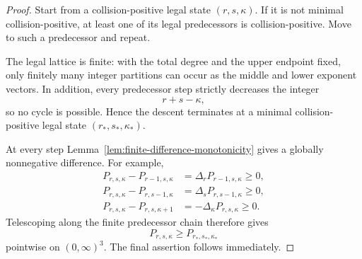 \documentclass[10pt,a4paper]{amsart}
\begin{document}
\begin{proof}
Start from a collision-positive legal state \((r,s,\kappa)\).  If it is not minimal collision-positive, at least one of its legal predecessors is collision-positive.  Move to such a predecessor and repeat.

The legal lattice is finite: with the total degree and the upper endpoint fixed, only finitely many integer partitions can occur as the middle and lower exponent vectors.  In addition, every predecessor step strictly decreases the integer
\begin{equation*}
r+s-\kappa,
\end{equation*}
so no cycle is possible.  Hence the descent terminates at a minimal collision-positive legal state \((r_*,s_*,\kappa_*)\).

At every step Lemma~\ref{lem:finite-difference-monotonicity} gives a globally nonnegative difference.  For example,
\begin{align*}
P_{r,s,\kappa}-P_{r-1,s,\kappa}
&=
\Delta_rP_{r-1,s,\kappa}
\ge0,\\
P_{r,s,\kappa}-P_{r,s-1,\kappa}
&=
\Delta_sP_{r,s-1,\kappa}
\ge0,\\
P_{r,s,\kappa}-P_{r,s,\kappa+1}
&=
-\Delta_\kappa P_{r,s,\kappa}
\ge0.
\end{align*}
Telescoping along the finite predecessor chain therefore gives
\begin{equation*}
P_{r,s,\kappa}
\ge
P_{r_*,s_*,\kappa_*}
\end{equation*}
pointwise on \((0,\infty)^3\).  The final assertion follows immediately.
\end{proof}
\end{document}
